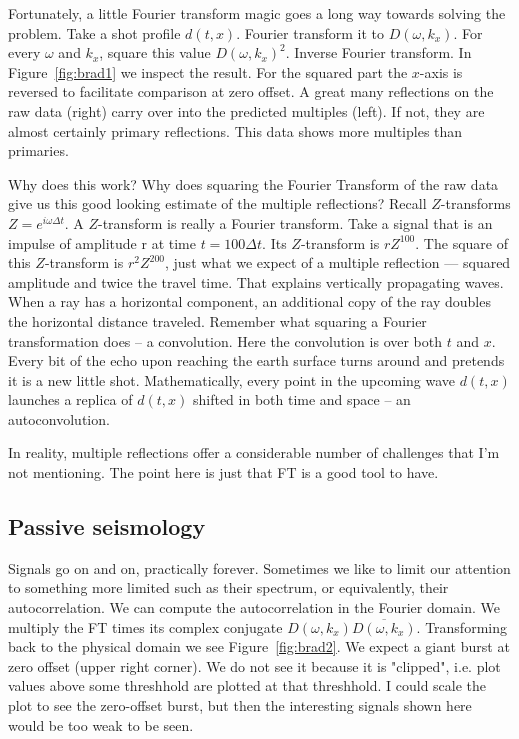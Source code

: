 \par
Fortunately, a little Fourier transform magic goes a long
way towards solving the problem.
Take a shot profile $d(t,x)$.
Fourier transform it to
$D(\omega, k_x)$.
For every $\omega$ and $k_x$, square this value $D(\omega, k_x)^2$.
Inverse Fourier transform.
In
Figure~\ref{fig:brad1}
we inspect the result.
For the squared part the $x$-axis is reversed
to facilitate comparison at zero offset.
A great many reflections on the raw data (right) carry over into the
predicted multiples (left).
If not, they are almost certainly primary reflections.
This data shows more multiples than primaries.


\par
Why does this work?  Why does squaring the Fourier Transform of the raw
data give us this good looking estimate of the multiple reflections?
Recall $Z$-transforms $Z=e^{i\omega\Delta t}$.
A $Z$-transform is really a Fourier transform.
Take a signal that is an impulse of amplitude r at time $t=100\Delta t$.
Its $Z$-transform is $r Z^{100}$.
The square of this $Z$-transform is $r^2 Z^{200}$,
just what we expect of a multiple reflection ---
squared amplitude and twice the travel time.
That explains vertically propagating waves.
When a ray has a horizontal component,
an additional copy of the ray doubles the horizontal distance traveled.
Remember what squaring a Fourier transformation does -- a convolution.
Here the convolution is over both $t$ and $x$.
Every bit of the echo upon reaching the earth surface
turns around and pretends it is a new little shot.
Mathematically, every point in the upcoming wave $d(t,x)$ launches a replica
of $d(t,x)$ shifted in both time and space -- an autoconvolution.

\par
In reality, multiple reflections offer a considerable number
of challenges that I'm not mentioning.
The point here is just that FT is a good
tool to have.

\subsection{Passive seismology}

\par
Signals go on and on, practically forever.
Sometimes we like to limit our attention to something more limited such
as their spectrum, or equivalently, their autocorrelation.
We can compute the autocorrelation in the Fourier domain.
We multiply the FT times its complex conjugate
$D(\omega, k_x) \overline{D(\omega, k_x)}$.
Transforming back to the physical domain we see Figure~\ref{fig:brad2}.
We expect a giant burst at zero offset (upper right corner).
We do not see it because it is "clipped",
i.e. plot values above some threshhold are plotted at that threshhold.
I could scale the plot to see the zero-offset  burst,
but then the interesting signals shown here would be too weak to be seen.
\par
{}


